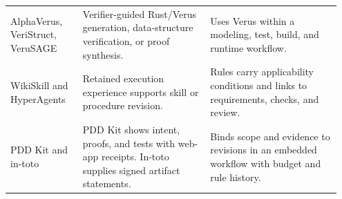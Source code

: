 \begin{table}[!t]
\begin{tabular}{@{}>{\raggedright\arraybackslash}p{0.20\linewidth}>{\raggedright\arraybackslash}p{0.37\linewidth}>{\raggedright\arraybackslash}p{0.38\linewidth}@{}}
\addlinespace[2pt]
AlphaVerus, VeriStruct, VeruSAGE~\cite{aggarwal2025alphaverus,sun2025veristruct,yang2025verusage} & Verifier-guided Rust/Verus generation, data-structure verification, or proof synthesis. & Uses Verus within a modeling, test, build, and runtime workflow. \\
\addlinespace[2pt]
WikiSkill and HyperAgents~\cite{tang2026wikiskill,zhang2026hyper} & Retained execution experience supports skill or procedure revision. & Rules carry applicability conditions and links to requirements, checks, and review. \\
\addlinespace[2pt]
PDD Kit and in-toto~\cite{lavaee2026pdd,intotoStatement} & PDD Kit shows intent, proofs, and tests with web-app receipts. In-toto supplies signed artifact statements. & Binds scope and evidence to revisions in an embedded workflow with budget and rule history. \\
\bottomrule
\end{tabular}
\end{table}

